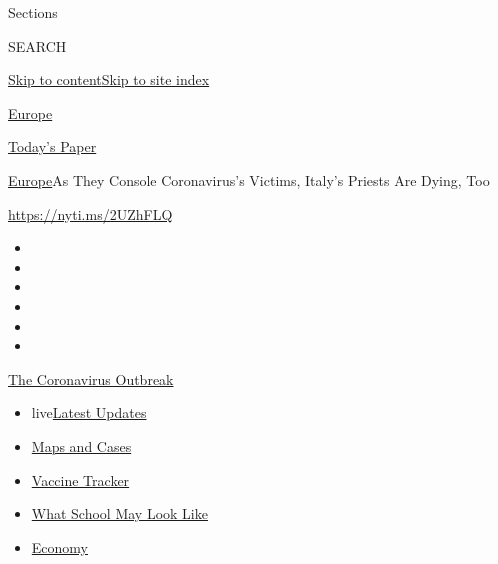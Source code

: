 Sections

SEARCH

\protect\hyperlink{site-content}{Skip to
content}\protect\hyperlink{site-index}{Skip to site index}

\href{https://www.nytimes3xbfgragh.onion/section/world/europe}{Europe}

\href{https://myaccount.nytimes3xbfgragh.onion/auth/login?response_type=cookie\&client_id=vi}{}

\href{https://www.nytimes3xbfgragh.onion/section/todayspaper}{Today's
Paper}

\href{/section/world/europe}{Europe}\textbar{}As They Console
Coronavirus's Victims, Italy's Priests Are Dying, Too

\url{https://nyti.ms/2UZhFLQ}

\begin{itemize}
\item
\item
\item
\item
\item
\item
\end{itemize}

\href{https://www.nytimes3xbfgragh.onion/news-event/coronavirus?action=click\&pgtype=Article\&state=default\&region=TOP_BANNER\&context=storylines_menu}{The
Coronavirus Outbreak}

\begin{itemize}
\tightlist
\item
  live\href{https://www.nytimes3xbfgragh.onion/2020/08/02/world/coronavirus-updates.html?action=click\&pgtype=Article\&state=default\&region=TOP_BANNER\&context=storylines_menu}{Latest
  Updates}
\item
  \href{https://www.nytimes3xbfgragh.onion/interactive/2020/us/coronavirus-us-cases.html?action=click\&pgtype=Article\&state=default\&region=TOP_BANNER\&context=storylines_menu}{Maps
  and Cases}
\item
  \href{https://www.nytimes3xbfgragh.onion/interactive/2020/science/coronavirus-vaccine-tracker.html?action=click\&pgtype=Article\&state=default\&region=TOP_BANNER\&context=storylines_menu}{Vaccine
  Tracker}
\item
  \href{https://www.nytimes3xbfgragh.onion/interactive/2020/07/29/us/schools-reopening-coronavirus.html?action=click\&pgtype=Article\&state=default\&region=TOP_BANNER\&context=storylines_menu}{What
  School May Look Like}
\item
  \href{https://www.nytimes3xbfgragh.onion/live/2020/07/31/business/stock-market-today-coronavirus?action=click\&pgtype=Article\&state=default\&region=TOP_BANNER\&context=storylines_menu}{Economy}
\end{itemize}

